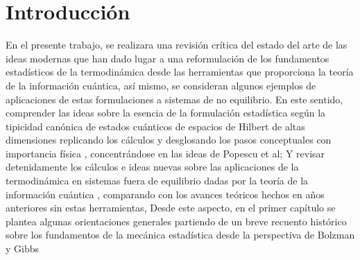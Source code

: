 \chapter*{Introducción}
En el presente trabajo, se realizara una revisión crítica del estado del arte de las ideas modernas que han dado lugar a una reformulación de los fundamentos estadísticos de la termodinámica desde las herramientas que proporciona la teoría de la información cuántica, así mismo, se  consideran algunos ejemplos de aplicaciones de estas formulaciones  a sistemas de no equilibrio.   
   En este sentido, comprender las ideas sobre la esencia de la formulación estadística según la tipicidad canónica de estados cuánticos de espacios  de Hilbert  de altas dimensiones replicando los cálculos y desglosando los pasos conceptuales con importancia física , concentrándose en las ideas de Popescu et al;  Y revisar detenidamente los cálculos e ideas nuevas  sobre las aplicaciones de la termodinámica en sistemas fuera de equilibrio dadas por la teoría de la información cuántica , comparando con los avances teóricos  hechos en años anteriores  sin estas herramientas,
Desde este aspecto,  en el primer capítulo se plantea algunas orientaciones generales partiendo de un breve recuento histórico sobre los fundamentos de la mecánica estadística desde la perspectiva de Bolzman  y Gibbs   

